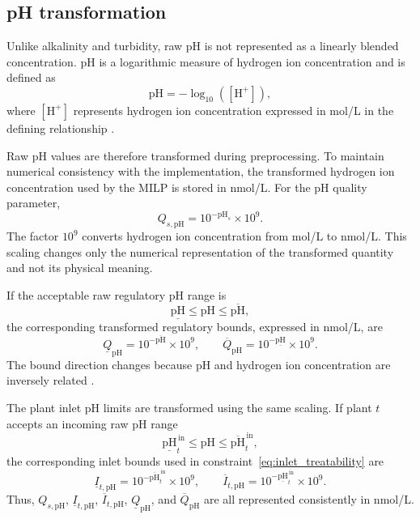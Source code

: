 \documentclass[10pt]{article}
\begin{document}
\subsection{pH transformation}

Unlike alkalinity and turbidity, raw pH is not represented as a linearly blended concentration.
pH is a logarithmic measure of hydrogen ion concentration and is defined as \cite{WHO2007pH}
\begin{equation}\label{eq:ph_definition}
    \mathrm{pH} = -\log_{10}([\mathrm{H}^{+}]),
\end{equation}
where $[\mathrm{H}^{+}]$ represents hydrogen ion concentration expressed in mol/L in the defining relationship \cite{EPA2026pH}.

Raw pH values are therefore transformed during preprocessing.
To maintain numerical consistency with the implementation, the transformed hydrogen ion concentration used by the MILP is stored in nmol/L.
For the pH quality parameter,
\begin{equation}\label{eq:ph_source_transformation}
    Q_{s,\mathrm{pH}}
    =
    10^{-\mathrm{pH}_s}\times 10^{9}.
\end{equation}
The factor $10^{9}$ converts hydrogen ion concentration from mol/L to nmol/L.
This scaling changes only the numerical representation of the transformed quantity and not its physical meaning.

If the acceptable raw regulatory pH range is
\begin{equation}\label{eq:raw_ph_range}
    \underline{\mathrm{pH}}
    \le
    \mathrm{pH}
    \le
    \overline{\mathrm{pH}},
\end{equation}
the corresponding transformed regulatory bounds, expressed in nmol/L, are
\begin{equation}\label{eq:ph_bound_transformation}
    \underline{Q}_{\mathrm{pH}}
    =
    10^{-\overline{\mathrm{pH}}}\times 10^{9},
    \qquad
    \overline{Q}_{\mathrm{pH}}
    =
    10^{-\underline{\mathrm{pH}}}\times 10^{9}.
\end{equation}
The bound direction changes because pH and hydrogen ion concentration are inversely related \cite{Fondriest2025pH}.

The plant inlet pH limits are transformed using the same scaling.
If plant $t$ accepts an incoming raw pH range
\begin{equation}\label{eq:raw_ph_inlet_range}
    \underline{\mathrm{pH}}^{\,\mathrm{in}}_t
    \le
    \mathrm{pH}
    \le
    \overline{\mathrm{pH}}^{\,\mathrm{in}}_t,
\end{equation}
the corresponding inlet bounds used in constraint~\eqref{eq:inlet_treatability} are
\begin{equation}\label{eq:ph_inlet_bound_transformation}
    \underline{I}_{t,\mathrm{pH}}
    =
    10^{-\overline{\mathrm{pH}}^{\,\mathrm{in}}_t}\times 10^{9},
    \qquad
    \overline{I}_{t,\mathrm{pH}}
    =
    10^{-\underline{\mathrm{pH}}^{\,\mathrm{in}}_t}\times 10^{9}.
\end{equation}
Thus, $Q_{s,\mathrm{pH}}$, $\underline{I}_{t,\mathrm{pH}}$, $\overline{I}_{t,\mathrm{pH}}$, $\underline{Q}_{\mathrm{pH}}$, and $\overline{Q}_{\mathrm{pH}}$ are all represented consistently in nmol/L.
\end{document}
